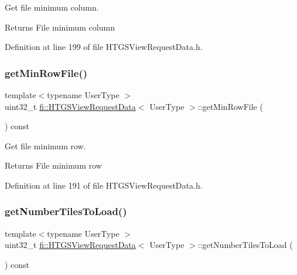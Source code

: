 Get file minimum column. 

\begin{DoxyReturn}{Returns}
File minimum column 
\end{DoxyReturn}


Definition at line 199 of file H\+T\+G\+S\+View\+Request\+Data.\+h.

\mbox{\label{classfi_1_1HTGSViewRequestData_a309a84d7eb8509b784124d74b9c986cd}} 
\subsubsection{\texorpdfstring{get\+Min\+Row\+File()}{getMinRowFile()}}
{\footnotesize\ttfamily template$<$typename User\+Type $>$ \\
uint32\+\_\+t \hyperlink{classfi_1_1HTGSViewRequestData}{fi\+::\+H\+T\+G\+S\+View\+Request\+Data}$<$ User\+Type $>$\+::get\+Min\+Row\+File (\begin{DoxyParamCaption}{ }\end{DoxyParamCaption}) const\hspace{0.3cm}{\ttfamily [inline]}}



Get file minimum row. 

\begin{DoxyReturn}{Returns}
File minimum row 
\end{DoxyReturn}


Definition at line 191 of file H\+T\+G\+S\+View\+Request\+Data.\+h.

\mbox{\label{classfi_1_1HTGSViewRequestData_abd7de0d0a3785d999a861da5c995906e}} 
\subsubsection{\texorpdfstring{get\+Number\+Tiles\+To\+Load()}{getNumberTilesToLoad()}}
{\footnotesize\ttfamily template$<$typename User\+Type $>$ \\
uint32\+\_\+t \hyperlink{classfi_1_1HTGSViewRequestData}{fi\+::\+H\+T\+G\+S\+View\+Request\+Data}$<$ User\+Type $>$\+::get\+Number\+Tiles\+To\+Load (\begin{DoxyParamCaption}{ }\end{DoxyParamCaption}) const\hspace{0.3cm}{\ttfamily [inline]}}



